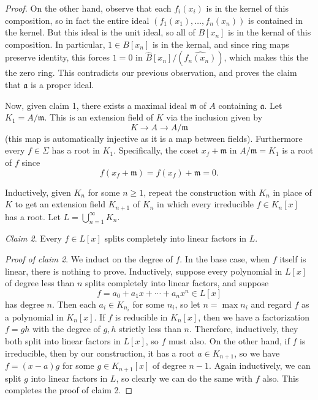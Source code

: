 \begin{proof}
On the other hand, observe that each $ f_i(x_i)$ is in the kernel of this composition, so in fact the entire ideal $ (f_1(x_1), \dotsc, f_n(x_n))$ is contained in the kernel. But this ideal is the unit ideal, so all of $ B[x_n]$ is in the kernal of this composition. In particular, $ 1 \in B[x_n]$ is in the kernal, and since ring maps preserve identity, this forces $ 1 = 0$ in $ \hat{B}[x_n]/(\widehat{f_n(x_n)})$, which makes this the the zero ring. This contradicts our previous observation, and proves the claim that $ \mathfrak{a}$ is a proper ideal.

Now, given claim 1, there exists a maximal ideal $ \mathfrak{m}$ of $ A$ containing $ \mathfrak{a}$. Let $ K_1 = A/\mathfrak{m}$. This is an extension field of $ K$ via the inclusion given by
\[ K \to A \to A/\mathfrak{m} \]
(this map is automatically injective as it is a map between fields). Furthermore every $ f \in \Sigma$ has a root in $ K_1$. Specifically, the coset $ x_f + \mathfrak{m}$ in $ A/\mathfrak{m} = K_1$ is a root of $ f$ since
\[ f(x_f + \mathfrak{m}) = f(x_f) + \mathfrak{m} = 0. \]

Inductively, given $ K_n$ for some $ n \geq 1$, repeat the construction with $ K_n$ in place of $ K$ to get an extension field $ K_{n+1}$ of $ K_n$ in which every irreducible $ f \in K_n[x]$ has a root. Let $ L = \bigcup_{n = 1}^{\infty} K_n$.

\emph{Claim 2}. Every $ f \in L[x]$ splits completely into linear factors in $ L$.

\emph{Proof of claim 2}. We induct on the degree of $ f$. In the base case, when $ f$ itself is linear, there is nothing to prove. Inductively, suppose every polynomial in $ L[x]$ of degree less than $ n$ splits completely into linear factors, and suppose
\[ f = a_0 + a_1x + \dotsb + a_nx^n \in L[x] \]
has degree $ n$. Then each $ a_i \in K_{n_i}$ for some $ n_i$, so let $ n = \max n_i$ and regard $ f$ as a polynomial in $ K_n[x]$. If $ f$ is reducible in $ K_n[x]$, then we have a factorization $ f = gh$ with the degree of $ g, h$ strictly less than $ n$. Therefore, inductively, they both split into linear factors in $ L[x]$, so $ f$ must also. On the other hand, if $ f$ is irreducible, then by our construction, it has a root $ a\in K_{n+1}$, so we have $ f = (x - a) g$ for some $ g \in K_{n+1}[x]$ of degree $ n - 1$. Again inductively, we can split $ g$ into linear factors in $ L$, so clearly we can do the same with $ f$ also. This completes the proof of claim 2.


\end{proof}
